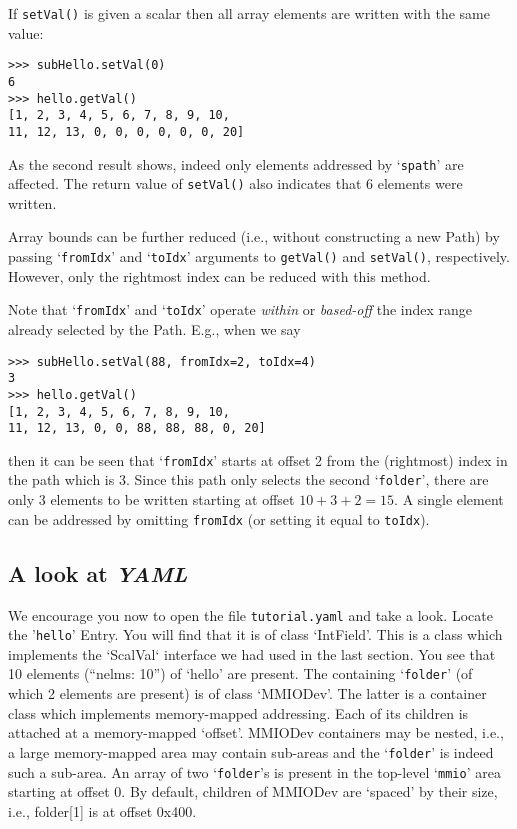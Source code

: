 \documentclass[10pt]{article}
\newcommand{\ita}[1]{\emph{#1}}
\newcommand{\yaml}      {\ita {YAML}}
\newcommand{\entry}     {{Entry}}
\newcommand{\Path}      {{Path}}
\newcommand{\cod}[1] {{\tt#1}}
\newcommand{\tutyaml} {\cod{tutorial.yaml}}
\begin{document}
If \cod{setVal()} is given a scalar then all array elements are written
with the same value:
\begin{verbatim}
>>> subHello.setVal(0)
6
>>> hello.getVal()
[1, 2, 3, 4, 5, 6, 7, 8, 9, 10,
11, 12, 13, 0, 0, 0, 0, 0, 0, 20]
\end{verbatim}
As the second result shows, indeed only elements addressed by `\cod{spath}'
are affected. The return value of \cod{setVal()} also indicates that 6 elements
were written.

Array bounds can be further reduced (i.e., without constructing a new \Path{})
by passing `\cod{fromIdx}' and `\cod{toIdx}' arguments to \cod{getVal()} and
\cod{setVal()}, respectively.
However, only the rightmost index can be reduced with this method.

Note that `\cod{fromIdx}' and `\cod{toIdx}' operate {\em within} or {\em based-off}
the index range already selected by the \Path{}. E.g., when we say

\begin{verbatim}
>>> subHello.setVal(88, fromIdx=2, toIdx=4)
3
>>> hello.getVal()
[1, 2, 3, 4, 5, 6, 7, 8, 9, 10,
11, 12, 13, 0, 0, 88, 88, 88, 0, 20]
\end{verbatim}

then it can be seen that `\cod{fromIdx}' starts at offset 2 from the (rightmost)
index in the path which is 3. Since this path only selects the second
`\cod{folder}', there are only 3 elements to be written starting at offset
$10+3+2=15$. A single element can be addressed by omitting \cod{fromIdx}
(or setting it equal to \cod{toIdx}).

\subsection{A look at \yaml{}}
We encourage you now to open the file \tutyaml{} and take a look.
Locate the '\cod{hello}' \entry{}. You will find that it is of class `IntField'.
This is a class which implements the `ScalVal` interface we had used in the
last section. You see that 10 elements (``nelms: 10'') of `hello' are present.
The containing `\cod{folder}' (of which 2 elements are present) is of class `MMIODev'.
The latter is a container class which implements memory-mapped addressing. Each of
its children is attached at a memory-mapped `offset'. MMIODev containers
may be nested, i.e., a large memory-mapped area may contain sub-areas and
the `\cod{folder}' is indeed such a sub-area. An array of two `\cod{folder}'s is
present in the top-level `\cod{mmio}' area starting at offset 0.
By default, children of MMIODev are `spaced' by their size, i.e., folder[1] is
at offset 0x400.
\end{document}
